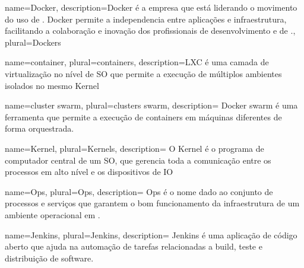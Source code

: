 
{
  name=Docker,
  description={Docker é a empresa que está liderando o movimento do uso de . Docker permite a independencia entre aplicações e infraestrutura, facilitando a colaboração e inovação dos profissionais de desenvolvimento e de .},
  plural=Dockers
}

{
  name=container,
  plural=containers,
  description={\gls{LXC} é uma camada de virtualização no nível de \gls{SO} que permite a execução de múltiplos ambientes isolados no mesmo \gls{Kernel}
  }
}

{
  name=cluster swarm,
  plural=clusters swarm,
  description={
    \gls{Docker} swarm é uma ferramenta que permite a execução de \glspl{container} em máquinas diferentes de forma orquestrada.
  }
}

{
  name=Kernel,
  plural=Kernels,
  description={
    O Kernel é o programa de computador central de um \gls{SO}, que gerencia toda a comunicação entre os processos em alto nível e os dispositivos de \gls{IO}
  }
}

{
  name=Ops,
  plural=Ops,
  description={
    Ops é o nome dado ao conjunto de processos e serviços que garantem o bom funcionamento da infraestrutura de um ambiente operacional em .
  }
}

{
  name=Jenkins,
  plural=Jenkins,
  description={
    Jenkins é uma aplicação de código aberto que ajuda na automação de tarefas relacionadas a build, teste e distribuição de software.
  }
}

